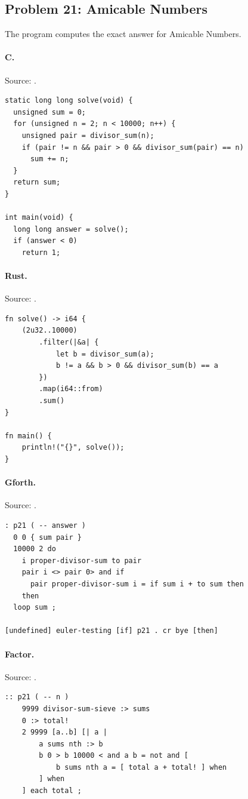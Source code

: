 \subsection{Problem 21: Amicable Numbers}
\label{walkthrough:p21}
The program computes the exact answer for Amicable Numbers.

\paragraph{C.} Source: .
\begin{lstlisting}
static long long solve(void) {
  unsigned sum = 0;
  for (unsigned n = 2; n < 10000; n++) {
    unsigned pair = divisor_sum(n);
    if (pair != n && pair > 0 && divisor_sum(pair) == n)
      sum += n;
  }
  return sum;
}

int main(void) {
  long long answer = solve();
  if (answer < 0)
    return 1;
\end{lstlisting}

\paragraph{Rust.} Source: .
\begin{lstlisting}
fn solve() -> i64 {
    (2u32..10000)
        .filter(|&a| {
            let b = divisor_sum(a);
            b != a && b > 0 && divisor_sum(b) == a
        })
        .map(i64::from)
        .sum()
}

fn main() {
    println!("{}", solve());
}
\end{lstlisting}

\paragraph{Gforth.} Source: .
\begin{lstlisting}
: p21 ( -- answer )
  0 0 { sum pair }
  10000 2 do
    i proper-divisor-sum to pair
    pair i <> pair 0> and if
      pair proper-divisor-sum i = if sum i + to sum then
    then
  loop sum ;

[undefined] euler-testing [if] p21 . cr bye [then]
\end{lstlisting}

\paragraph{Factor.} Source: .
\begin{lstlisting}
:: p21 ( -- n )
    9999 divisor-sum-sieve :> sums
    0 :> total!
    2 9999 [a..b] [| a |
        a sums nth :> b
        b 0 > b 10000 < and a b = not and [
            b sums nth a = [ total a + total! ] when
        ] when
    ] each total ;
\end{lstlisting}

